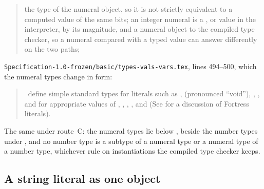 \begin{description}
\begin{quote}
 the type of the numeral object, so it is not strictly
equivalent to a computed  value of the same bits;
an integer numeral is a ,  or
 value in the interpreter, by its magnitude, and a numeral
object to the compiled type checker, so a numeral
compared with a typed value can answer differently on the two paths;
\end{quote}
\nolinkurl{Specification-1.0-frozen/basic/types-vals-vars.tex}, lines 494--500,
which the numeral types change in form:
\begin{quote}
\Library\ define simple standard types for literals such as
,
\TYP{()} (pronounced ``void''),
, , and
for appropriate values of , , , , and 
(See  for a discussion of Fortress literals).
\end{quote}
\item[Route C] The same under route~C: the numeral types lie below
, beside the number types under , and no number type
is a subtype of a numeral type or a numeral type of a number type, whichever
rule on instantiations the compiled type checker keeps.
\end{description}

\subsection{A string literal as one object}


